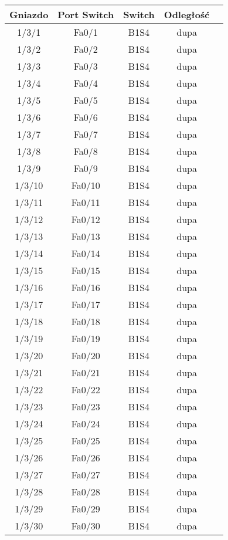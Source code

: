\begin{center}
    \begin{longtable}{|c|c|c|c|c|}
    \hline
    Gniazdo & Port Switch & Switch & Odległość \\ \hline
	1/3/1 & Fa0/1 & B1S4 & dupa \\ \hline
	1/3/2 & Fa0/2 & B1S4 & dupa \\ \hline
	1/3/3 & Fa0/3 & B1S4 & dupa \\ \hline
	1/3/4 & Fa0/4 & B1S4 & dupa \\ \hline
	1/3/5 & Fa0/5 & B1S4 & dupa \\ \hline
	1/3/6 & Fa0/6 & B1S4 & dupa \\ \hline
	1/3/7 & Fa0/7 & B1S4 & dupa \\ \hline
	1/3/8 & Fa0/8 & B1S4 & dupa \\ \hline
	1/3/9 & Fa0/9 & B1S4 & dupa \\ \hline
	1/3/10 & Fa0/10 & B1S4 & dupa \\ \hline
	1/3/11 & Fa0/11 & B1S4 & dupa \\ \hline
	1/3/12 & Fa0/12 & B1S4 & dupa \\ \hline
	1/3/13 & Fa0/13 & B1S4 & dupa \\ \hline
	1/3/14 & Fa0/14 & B1S4 & dupa \\ \hline
	1/3/15 & Fa0/15 & B1S4 & dupa \\ \hline
	1/3/16 & Fa0/16 & B1S4 & dupa \\ \hline
	1/3/17 & Fa0/17 & B1S4 & dupa \\ \hline
	1/3/18 & Fa0/18 & B1S4 & dupa \\ \hline
	1/3/19 & Fa0/19 & B1S4 & dupa \\ \hline
	1/3/20 & Fa0/20 & B1S4 & dupa \\ \hline
	1/3/21 & Fa0/21 & B1S4 & dupa \\ \hline
	1/3/22 & Fa0/22 & B1S4 & dupa \\ \hline
	1/3/23 & Fa0/23 & B1S4 & dupa \\ \hline
	1/3/24 & Fa0/24 & B1S4 & dupa \\ \hline
	1/3/25 & Fa0/25 & B1S4 & dupa \\ \hline
	1/3/26 & Fa0/26 & B1S4 & dupa \\ \hline
	1/3/27 & Fa0/27 & B1S4 & dupa \\ \hline
	1/3/28 & Fa0/28 & B1S4 & dupa \\ \hline
	1/3/29 & Fa0/29 & B1S4 & dupa \\ \hline
	1/3/30 & Fa0/30 & B1S4 & dupa \\ \hline

\end{longtable}
\end{center}
